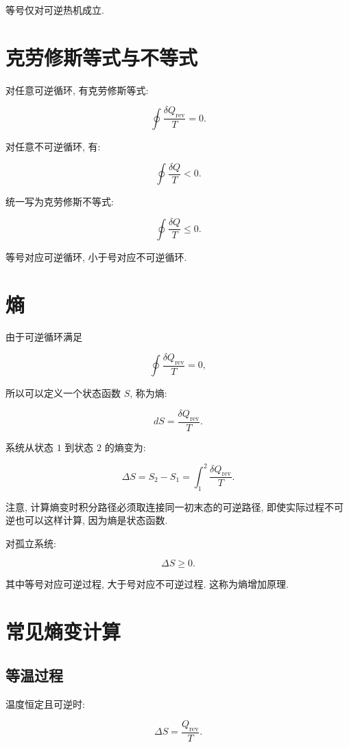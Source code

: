 \documentclass[
  a4paper,
]{ctexrep}
\begin{document}
等号仅对可逆热机成立.

\section{克劳修斯等式与不等式}\label{ux514bux52b3ux4feeux65afux7b49ux5f0fux4e0eux4e0dux7b49ux5f0f}

对任意可逆循环, 有克劳修斯等式:

\[
\oint \frac{\delta Q_{\mathrm{rev}}}{T}=0.
\]

对任意不可逆循环, 有:

\[
\oint \frac{\delta Q}{T}<0.
\]

统一写为克劳修斯不等式:

\[
\oint \frac{\delta Q}{T}\leq 0.
\]

等号对应可逆循环, 小于号对应不可逆循环.

\section{熵}\label{ux71b5}

由于可逆循环满足

\[
\oint \frac{\delta Q_{\mathrm{rev}}}{T}=0,
\]

所以可以定义一个状态函数 \(S\), 称为熵:

\[
dS=\frac{\delta Q_{\mathrm{rev}}}{T}.
\]

系统从状态 \(1\) 到状态 \(2\) 的熵变为:

\[
\Delta S=S_2-S_1=\int_1^2\frac{\delta Q_{\mathrm{rev}}}{T}.
\]

注意, 计算熵变时积分路径必须取连接同一初末态的可逆路径,
即使实际过程不可逆也可以这样计算, 因为熵是状态函数.

对孤立系统:

\[
\Delta S\geq 0.
\]

其中等号对应可逆过程, 大于号对应不可逆过程. 这称为熵增加原理.

\section{常见熵变计算}\label{ux5e38ux89c1ux71b5ux53d8ux8ba1ux7b97}

\subsection{等温过程}\label{ux7b49ux6e29ux8fc7ux7a0b}

温度恒定且可逆时:

\[
\Delta S=\frac{Q_{\mathrm{rev}}}{T}.
\]
\end{document}
